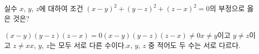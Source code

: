 실수 $x$, $y$, $z$에 대하여 조건 $(x-y)^2+(y-z)^2+(z-x)^2=0$의 부정으로 옳은 것은?
\begin{choicesv}{$(x-y)(y-z)(z-x)=0$}{$(x-y)(y-z)(z-x)\ne 0$}{$x\ne y$이고 $y\ne z$이고 $z\ne x$}{$x$, $y$, $z$는 모두 서로 다른 수이다.}{$x$, $y$, $z$ 중 적어도 두 수는 서로 다르다.}\end{choicesv}
